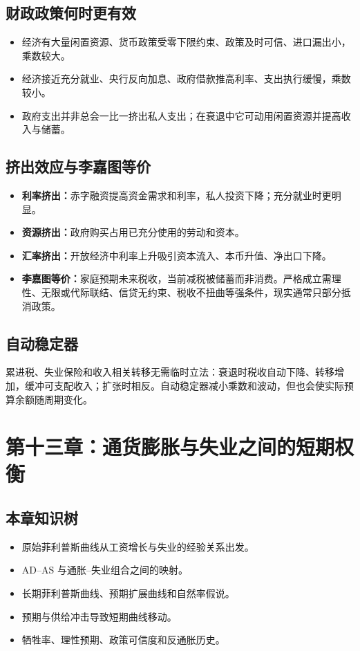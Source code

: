 \documentclass[UTF8,11pt,a4paper]{ctexart}
\newcommand{\term}[1]{\textbf{#1}}
\begin{document}
\subsection{财政政策何时更有效}
\begin{itemize}
  \item 经济有大量闲置资源、货币政策受零下限约束、政策及时可信、进口漏出小，乘数较大。
  \item 经济接近充分就业、央行反向加息、政府借款推高利率、支出执行缓慢，乘数较小。
  \item 政府支出并非总会一比一挤出私人支出；在衰退中它可动用闲置资源并提高收入与储蓄。
\end{itemize}

\subsection{挤出效应与李嘉图等价}
\begin{itemize}
  \item \term{利率挤出：}赤字融资提高资金需求和利率，私人投资下降；充分就业时更明显。
  \item \term{资源挤出：}政府购买占用已充分使用的劳动和资本。
  \item \term{汇率挤出：}开放经济中利率上升吸引资本流入、本币升值、净出口下降。
  \item \term{李嘉图等价：}家庭预期未来税收，当前减税被储蓄而非消费。严格成立需理性、无限或代际联结、信贷无约束、税收不扭曲等强条件，现实通常只部分抵消政策。
\end{itemize}

\subsection{自动稳定器}
累进税、失业保险和收入相关转移无需临时立法：衰退时税收自动下降、转移增加，缓冲可支配收入；扩张时相反。自动稳定器减小乘数和波动，但也会使实际预算余额随周期变化。

\newpage
\section{第十三章：通货膨胀与失业之间的短期权衡}

\subsection{本章知识树}
\begin{itemize}
  \item 原始菲利普斯曲线从工资增长与失业的经验关系出发。
  \item AD--AS 与通胀--失业组合之间的映射。
  \item 长期菲利普斯曲线、预期扩展曲线和自然率假说。
  \item 预期与供给冲击导致短期曲线移动。
  \item 牺牲率、理性预期、政策可信度和反通胀历史。
\end{itemize}
\end{document}
